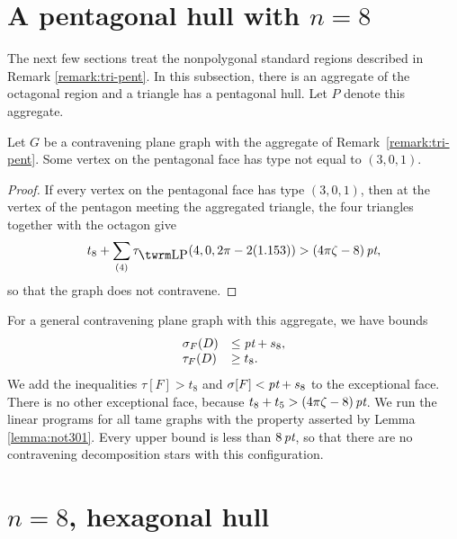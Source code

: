 
\section{A pentagonal hull with $n=8$} %
\label{sec:pentagonal} \label{sec:3.6}

The next few sections treat the nonpolygonal standard regions
described in Remark \ref{remark:tri-pent}. In this subsection,
there is an aggregate of the octagonal region and a triangle has a
pentagonal hull. Let $P$ denote this aggregate.

\begin{lemma}
\label{lemma:not301} Let $G$ be a  contravening plane graph with
the aggregate of Remark~\ref{remark:tri-pent}. Some vertex on the
pentagonal face has type not equal to $(3,0,1)$.
\end{lemma}

\begin{proof} If every vertex on the pentagonal face has type
$(3,0,1)$, then at the vertex of the pentagon meeting the aggregated
triangle, the four triangles together with the octagon give
    $$t_8+\sum_{(4)}\tauLP(4,0,2\pi-2(1.153)) > \squander,$$
so that the graph does not contravene.
\end{proof}

For a general contravening plane graph with this aggregate,
 we have bounds
    $$
    \begin{array}{lll}
    \sigma_F(D)&\le\hbox{\it pt}+s_8,\\
    \tau_F(D)&\ge t_8.
    \end{array}
    $$
We add the inequalities $\tau[F]>t_8$ and $\sigma[F]< \hbox{\it pt}+s_8$ to
the exceptional face. There is no other exceptional face, because
$t_8+t_5>(4\pi\zeta-8)\,\hbox{\it pt}$. We run the linear programs for all tame
graphs with the property asserted by Lemma \ref{lemma:not301}.
Every upper bound is less than $8\,\hbox{\it pt}$, so that there are no
contravening decomposition stars with this configuration.


\section{$n=8$, hexagonal hull} %
\label{sec:hexagonal}
 \label{3.7}

